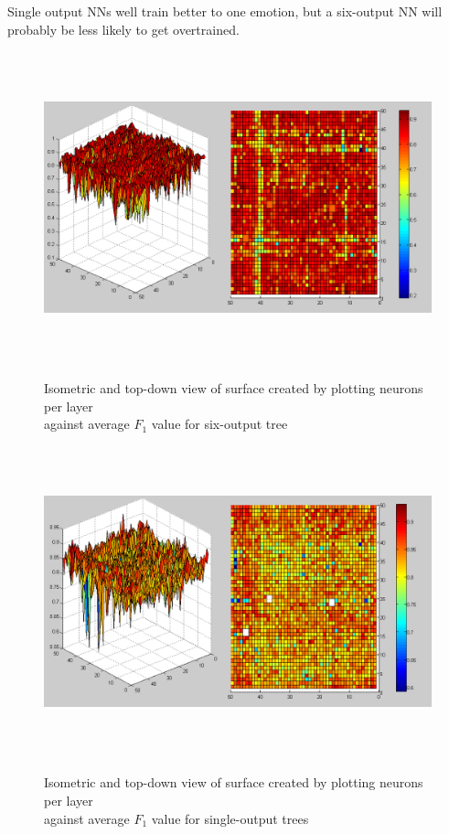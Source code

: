 \documentclass[a4paper]{article}
\begin{document}
Single output NNs well train better to one emotion, but a six-output NN will probably be 
less likely to get overtrained.

\begin{figure}[p]
  \centering
  {\includegraphics[height=90mm]{6-out-topology.png}}
  \caption{Isometric and top-down view of surface created by plotting neurons per layer \\ against average $F_1$ value for six-output tree}
\end{figure}

\begin{figure}[p]
  \centering
  {\includegraphics[height=90mm]{1-out-topology.png}}
  \caption{Isometric and top-down view of surface created by plotting neurons per layer \\ against average $F_1$ value for single-output trees}
\end{figure}
\end{document}
